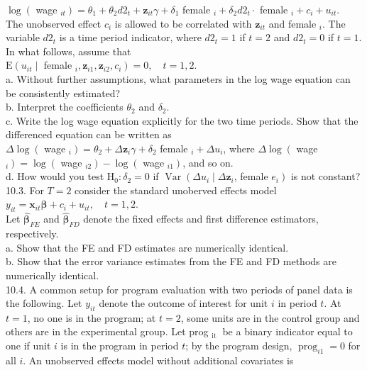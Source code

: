 \documentclass[10pt]{article}
\begin{document}
$\log \left(\right.$ wage $\left._{i t}\right)=\theta_{1}+\theta_{2} d 2_{t}+\mathbf{z}_{i t} \gamma+\delta_{1}$ female $_{i}+\delta_{2} d 2_{t} \cdot$ female $_{i}+c_{i}+u_{i t}$.\\
The unobserved effect $c_{i}$ is allowed to be correlated with $\mathbf{z}_{i t}$ and female ${ }_{i}$. The variable $d 2_{t}$ is a time period indicator, where $d 2_{t}=1$ if $t=2$ and $d 2_{t}=0$ if $t=1$. In what follows, assume that\\
$\mathrm{E}\left(u_{i t} \mid\right.$ female $\left._{i}, \mathbf{z}_{i 1}, \mathbf{z}_{i 2}, c_{i}\right)=0, \quad t=1,2$.\\
a. Without further assumptions, what parameters in the log wage equation can be consistently estimated?\\
b. Interpret the coefficients $\theta_{2}$ and $\delta_{2}$.\\
c. Write the log wage equation explicitly for the two time periods. Show that the differenced equation can be written as\\
$\Delta \log \left(\right.$ wage $\left._{i}\right)=\theta_{2}+\Delta \mathbf{z}_{i} \gamma+\delta_{2}$ female $_{i}+\Delta u_{i}$, where $\Delta \log \left(\right.$ wage $\left._{i}\right)=\log \left(\right.$ wage $\left._{i 2}\right)-\log \left(\right.$ wage $\left._{i 1}\right)$, and so on.\\
d. How would you test $\mathrm{H}_{0}: \delta_{2}=0$ if $\operatorname{Var}\left(\Delta u_{i} \mid \Delta \mathbf{z}_{i}\right.$, female $\left.e_{i}\right)$ is not constant?\\
10.3. For $T=2$ consider the standard unoberved effects model\\
$y_{i t}=\mathbf{x}_{i t} \boldsymbol{\beta}+c_{i}+u_{i t}, \quad t=1,2$.\\
Let $\hat{\boldsymbol{\beta}}_{F E}$ and $\hat{\boldsymbol{\beta}}_{F D}$ denote the fixed effects and first difference estimators, respectively.\\
a. Show that the FE and FD estimates are numerically identical.\\
b. Show that the error variance estimates from the FE and FD methods are numerically identical.\\
10.4. A common setup for program evaluation with two periods of panel data is the following. Let $y_{i t}$ denote the outcome of interest for unit $i$ in period $t$. At $t=1$, no one is in the program; at $t=2$, some units are in the control group and others are in the experimental group. Let prog $_{\text {it }}$ be a binary indicator equal to one if unit $i$ is in the program in period $t$; by the program design, $\operatorname{prog}_{i 1}=0$ for all $i$. An unobserved effects model without additional covariates is\\
\end{document}
